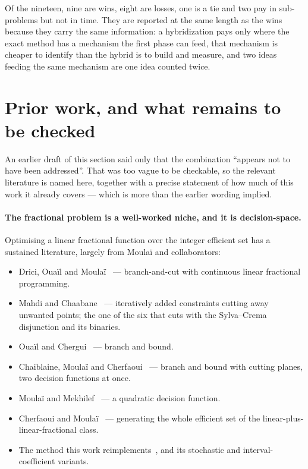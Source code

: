 \documentclass[11pt,a4paper]{article}
\begin{document}
\noindent
Of the nineteen, nine are wins, eight are losses, one is a tie and two pay
in sub-problems but not in time. They are reported at the same length as the wins
because they carry the same information: a hybridization pays only where the
exact method has a mechanism the first phase can feed, that mechanism is
cheaper to identify than the hybrid is to build and measure, and two ideas
feeding the same mechanism are one idea counted twice.

\section{Prior work, and what remains to be checked}
\label{sec:prior}

An earlier draft of this section said only that the combination ``appears not
to have been addressed''. That was too vague to be checkable, so the relevant
literature is named here, together with a precise statement of how much of this
work it already covers --- which is more than the earlier wording implied.

\paragraph{The fractional problem is a well-worked niche, and it is
decision-space.}
Optimising a linear fractional function over the integer efficient set has a
sustained literature, largely from Moula\"i and collaborators:

\begin{itemize}\itemsep2pt
\item Drici, Oua\"il and Moula\"i~\cite{drici2018} --- branch-and-cut with
      continuous linear fractional programming.
\item Mahdi and Chaabane~\cite{mahdi2015} --- iteratively added constraints
      cutting away unwanted points; the one of the six that cuts with the
      Sylva--Crema disjunction and its binaries.
\item Oua\"il and Chergui~\cite{ouail2019} --- branch and bound.
\item Chaiblaine, Moula\"i and Cherfaoui~\cite{chaiblaine2020} --- branch and
      bound with cutting planes, two decision functions at once.
\item Moula\"i and Mekhilef~\cite{moulai2021} --- a quadratic decision
      function.
\item Cherfaoui and Moula\"i~\cite{cherfaoui2021} --- generating the whole
      efficient set of the linear-plus-linear-fractional class.
\item The method this work reimplements~\cite{younsiabbaci2025}, and its
      stochastic and interval-coefficient variants.
\end{itemize}
\end{document}
